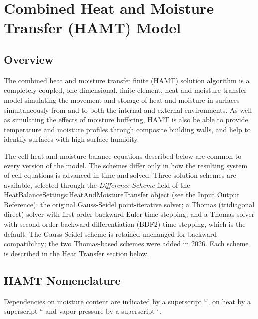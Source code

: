 \section{Combined Heat and Moisture Transfer (HAMT) Model}\label{combined-heat-and-moisture-transfer-hamt-model}

\subsection{Overview}\label{overview-011}

The combined heat and moisture transfer finite (HAMT) solution algorithm is a completely coupled, one-dimensional, finite element, heat and moisture transfer model simulating the movement and storage of heat and moisture in surfaces simultaneously from and to both the internal and external environments. As well as simulating the effects of moisture buffering, HAMT is also be able to provide temperature and moisture profiles through composite building walls, and help to identify surfaces with high surface humidity.

The cell heat and moisture balance equations described below are common to every version of the model. The schemes differ only in how the resulting system of cell equations is advanced in time and solved. Three solution schemes are available, selected through the \emph{Difference Scheme} field of the HeatBalanceSettings:HeatAndMoistureTransfer object (see the Input Output Reference): the original Gauss-Seidel point-iterative solver; a Thomas (tridiagonal direct) solver with first-order backward-Euler time stepping; and a Thomas solver with second-order backward differentiation (BDF2) time stepping, which is the default. The Gauss-Seidel scheme is retained unchanged for backward compatibility; the two Thomas-based schemes were added in 2026. Each scheme is described in the \hyperref[heat-transfer]{Heat Transfer} section below.

\subsection{HAMT Nomenclature}\label{hamt-nomenclature}

Dependencies on moisture content are indicated by a superscript \(^{w}\), on heat by a superscript \(^{h}\) and vapor pressure by a superscript \(^{v}\).


